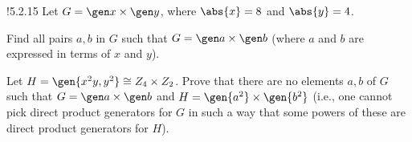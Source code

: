\begin{exercise}!{5.2.15}
    Let $G = \gen x \times \gen y$, where $\abs{x} = 8$ and $\abs{y} = 4$.
    \begin{subexercises}
        \item Find all pairs $a, b$ in $G$ such that $G = \gen a \times \gen b$ (where $a$ and $b$ are expressed in terms of $x$ and $y$).
        \item Let $H = \gen{x^2y, y^2} \cong Z_4 \times Z_2$.
	    Prove that there are no elements $a, b$ of $G$ such that $G = \gen a \times \gen b$ and $H = \gen{a^2} \times \gen{b^2}$ (i.e., one cannot pick direct product generators for $G$ in such a way that some powers of these are direct product generators for $H$).
    \end{subexercises}
\end{exercise}

